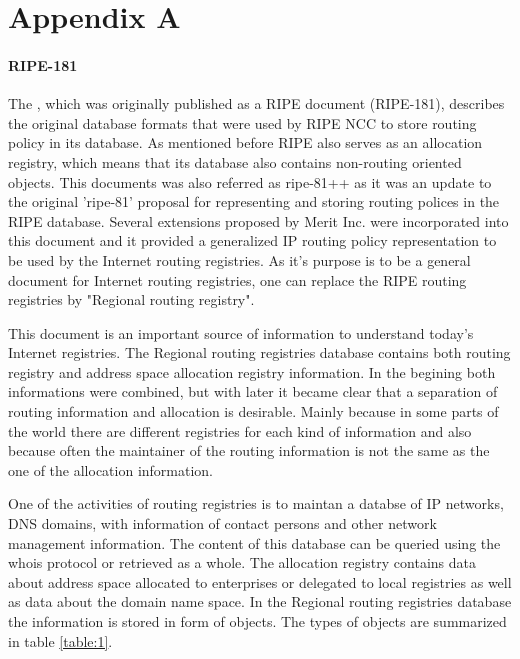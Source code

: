 \documentclass[11pt,a4paper]{scrreprt}
\begin{document}
\chapter{Appendix A}

\subsubsection{RIPE-181}

The \cite{RFC_1786}, which was originally published as a RIPE document (RIPE-181), describes the original database formats that were used by RIPE NCC to store routing policy in its database. As mentioned before RIPE also serves as an allocation registry, which means that its database also contains non-routing oriented objects. 
This documents was also referred as ripe-81++ as it was an update to the original 'ripe-81' proposal for representing and storing routing polices in the RIPE database. Several extensions proposed by Merit Inc. were incorporated into this document and it provided a generalized IP routing policy representation to be used by the Internet routing registries. As it's purpose is to be a general document for Internet routing registries, one can replace the RIPE routing registries by "Regional routing registry".

This document is an important source of information to understand today's Internet registries. 
The Regional routing registries database contains both routing registry and address space allocation registry information. In the begining both informations were combined, but with later it became clear that a separation
of routing information and allocation is desirable. Mainly because in some parts of the world there are different registries for each kind of information and also because often the maintainer of the routing information is not the same as the one of the allocation information.

One of the activities of routing registries is to maintan a databse of IP networks, DNS domains, with information of contact persons and other network management information. The content of this database can be queried using the whois protocol or retrieved as a whole.
The allocation registry contains data about address space allocated to enterprises or delegated to local registries as well as data about the domain name space. 
In the Regional routing registries database the information is stored in form of objects. The types of objects are summarized in table \ref{table:1}.   
   
\end{document}
